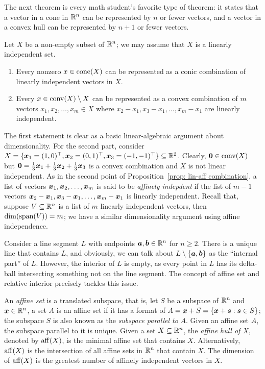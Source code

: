 The next theorem is every math student's favorite type of theorem: it states that a vector in a cone in $\mathbb R^n$ can be represented by $n$ or fewer vectors, and a vector in a convex hull can be represented by $n + 1$ or fewer vectors. 

\begin{proposition}\label{prop: lin-aff combination}
Let $X$ be a non-empty subset of $\mathbb R^n$; we may assume that $X$ is a linearly independent set.  
\begin{enumerate}[noitemsep]
\item Every nonzero $x\in \operatorname{cone}(X)$ can be represented as a conic combination of linearly independent vectors in $X$. 
\item Every $x\in\operatorname{conv}(X)\setminus X$ can be represented as a convex combination of $m$ vectors $x_1, x_2, \dots, x_m\in X$ where  $x_2 - x_1, x_3 - x_1, \dots, x_m - x_1$ are linearly independent.\hfill\qedsymbol
\end{enumerate}
\end{proposition}
The first statement is clear as a basic linear-algebraic argument about dimensionality. For the second part, consider $X = \{{\boldsymbol x}_1 = (1, 0)^\top, {\boldsymbol x}_2 = (0, 1)^\top, {\boldsymbol x}_3 = (-1, -1)^\top\}\subseteq\mathbb R^2$. Clearly, $\boldsymbol0\in \operatorname{conv}(X)$ but $\boldsymbol0 = \frac13{\boldsymbol x}_1 + \frac13{\boldsymbol x}_2 + \frac13{\boldsymbol x}_3$ is a convex combination and $X$ is not linear independent. 
As in the second point of Proposition~\ref{prop: lin-aff combination}, a list of vectors ${\boldsymbol x}_1, {\boldsymbol x}_2, \dots, {\boldsymbol x}_m$ is said to be {\em affinely indepdent} if the list of $m-1$ vectors ${\boldsymbol x}_2 - {\boldsymbol x}_1, {\boldsymbol x}_3 - {\boldsymbol x}_1, \dots, {\boldsymbol x}_m - {\boldsymbol x}_1$ is linearly independent. Recall that, suppose $V\subseteq\mathbb R^n$ is a list of $m$ linearly independent vectors, then $\dim(\operatorname{span}(V)) = m$; we have a similar dimensionality argument using affine independence.  



Consider a line segment $L$ with endpoints ${\boldsymbol a}, {\boldsymbol b}\in\mathbb R^{n}$ for $n\geq 2$. There is a unique line that contains $L$, and obviously, we can talk about $L\setminus \{{\boldsymbol a}, {\boldsymbol b}\}$ as the ``internal part'' of $L$. However, the interior of $L$ is empty, as every point in $L$ has its delta-ball intersecting something not on the line segment. The concept of affine set and relative interior precisely tackles this issue. 


An {\em affine set} is a translated subspace, that is, let $S$ be a subspace of $\mathbb R^{n}$ and ${\boldsymbol x} \in \mathbb R^{n}$, a set $A$ is an affine set if it has a format of $A = {\boldsymbol x} + S = \{{\boldsymbol x} + {\boldsymbol s}: \boldsymbol s\in S\}$; the subspace $S$ is also known as the {\em subspace parallel to} $A$. Given an affine set $A$, the subspace parallel to it is unique. Given a set $X\subseteq\mathbb R^{n}$, the {\em affine hull of $X$}, denoted by $\operatorname{aff}(X)$, is the minimal affine set that contains $X$. Alternatively, $\operatorname{aff}(X)$ is the intersection of all affine sets in $\mathbb R^{n}$ that contain $X$. The dimension of $\operatorname{aff}(X)$ is the greatest number of affinely independent vectors in $X$. 

